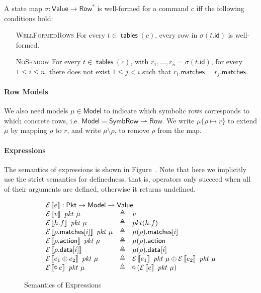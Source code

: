 \documentclass{article}
\newcommand{\pkt}{\mathit{pkt}}
\newcommand{\denote}[1]{\left\llbracket#1\right\rrbracket}
\newcommand{\edenote}[1]{\mathcal{E}\denote{#1}}
\newcommand{\binop}{\mathbin{\oplus}}
\newcommand{\unop}{\mathop{\text{\pointer}}}
\newcommand{\Value}{\mathsf{Value}}
\newcommand{\Pkt}{\mathsf{Pkt}}
\newcommand{\Model}{\mathsf{Model}}
\newcommand{\Row}{\mathsf{Row}}
\newcommand{\SymbRow}{\mathsf{SymbRow}}
\newcommand{\matches}{\mathsf{matches}}
\newcommand{\action}{\mathsf{action}}
\newcommand{\data}{\mathsf{data}}
\newcommand{\id}{\mathsf{id}}
\newcommand{\tables}{\mathop{\mathsf{tables}}}
\begin{document}
A state map $\sigma : \Value \to \Row^*$ is well-formed for a command $c$ iff the
following conditions hold:
\begin{enumerate}
\item[\textsc{WellFormedRows}] For every $t\in \tables(c)$, every row in $\sigma(t.\id)$ is well-formed.
\item[\textsc{NoShadow}] For every $t \in \tables(c)$, with $r_1,\ldots,r_n =
  \sigma(t.\id)$, for every $1 \leq i \leq n$, there does not exist $1 \leq j <
  i$ such that $r_i.\matches = r_j.\matches$.
\end{enumerate}
\paragraph{Row Models}
We also need models $\mu \in \Model$ to indicate which symbolic rows corresponds
to which concrete rows, i.e. $\Model = \SymbRow \rightharpoonup \Row$. We write
$\mu\{\rho \mapsto r\}$ to extend $\mu$ by mapping $\rho$ to $r$, and write $\mu
\setminus \rho$, to remove $\rho$ from the map.

\paragraph{Expressions}
The semantics of expressions is shown in Figure~\label{fig:sem-expr}. Note that
here we implicitly use the strict semantics for definedness, that is, operators
only succeed when all of their arguments are defined, otherwise it returns
undefined.

\begin{figure}[H]
  \[\begin{array}{l>{\triangleq}cl}
  \multicolumn{3}{l}{\edenote{e} : \Pkt \to \Model \rightharpoonup \Value }\\
    \edenote{v}~\pkt~\mu &&
    v \\
    \edenote{h.f}~\pkt~\mu &&
    pkt(h.f)\\
    \edenote{\rho.\matches[i]}~\pkt~\mu &&
    \mu(\rho).\matches[i] \\
    \edenote{\rho.\action}~\pkt~\mu &&
    \mu(\rho).\action \\
    \edenote{\rho.\data[i]} &&
    \mu(\rho).\data[i]\\
    \edenote{e_1 \binop e_2}~\pkt~\mu&&
    \edenote{e_1}~\pkt~\mu \binop
    \edenote{e_2}~\pkt~\mu \\
    \edenote{\unop e}~\pkt~\mu &&
    \unop \left(\edenote{e}~\pkt~\mu\right)
  \end{array}
  \]
  \caption{Semantics of Expressions}
  \label{fig:sem-expr}
\end{figure}
\end{document}
